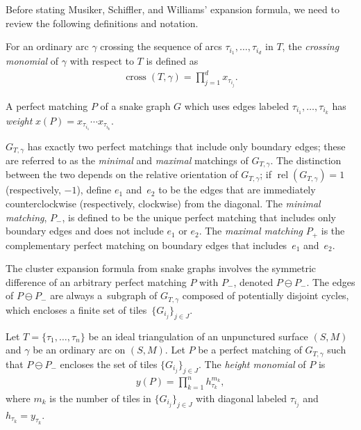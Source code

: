 \documentclass[11pt]{article}
\numberwithin{equation}{section}
\begin{document}
Before stating Musiker, Schiffler, and Williams' expansion formula, we need to review the following definitions and notation.

\begin{Definition}
For an ordinary arc $\gamma$ crossing the sequence of arcs $\tau_{i_1},\dots,\tau_{i_d}$ in $T$, the \emph{crossing monomial} of $\gamma$ with respect to $T$ is defined as
\begin{gather*}
\operatorname{cross}(T,\gamma) = \prod_{j=1}^d x_{\tau_{i_j}}.
\end{gather*}
\end{Definition}

\begin{Definition}
A perfect matching $P$ of a snake graph $G$ which uses edges labeled $\tau_{i_1}, \dots, \tau_{i_k}$ has \emph{weight} $x(P) = x_{\tau_{i_1}}\cdots x_{\tau_{i_k}}$.
\end{Definition}

\begin{Definition}
$G_{T,\gamma}$ has exactly two perfect matchings that include only boundary edges; these are referred to as the \emph{minimal} and \emph{maximal} matchings of $G_{T,\gamma}$. The distinction between the two depends on the relative orientation of $G_{T,\gamma}$; if $\operatorname{rel}(G_{T,\gamma}) = 1$ (respectively, $-1$), define $e_1$ and~$e_2$ to be the edges that are immediately counterclockwise (respectively, clockwise) from the diagonal. The \emph{minimal matching}, $P_{-}$, is defined to be the unique perfect matching that includes only boundary edges and does not include $e_1$ or $e_2$. The \emph{maximal mat\-ching} $P_{+}$ is the complementary perfect matching on boundary edges that includes~$e_1$ and~$e_2$.
\end{Definition}

The cluster expansion formula from snake graphs involves the symmetric difference of an arbitrary perfect matching $P$ with $P_{-}$, denoted $P \ominus P_{-}$. The edges of $P \ominus P_{-}$ are always a~subgraph of $G_{T,\gamma}$ composed of potentially disjoint cycles, which encloses a finite set of tiles~$\{ G_{i_j} \}_{j \in J}$.

\begin{Definition}
Let $T = \{ \tau_1, \dots, \tau_n \}$ be an ideal triangulation of an unpunctured surface $(S,M)$ and $\gamma$ be an ordinary arc on $(S,M)$. Let $P$ be a perfect matching of $G_{T,\gamma}$ such that $P \ominus P_{-}$ encloses the set of tiles $\{ G_{i_j} \}_{j \in J}$. The \emph{height monomial} of $P$ is
\begin{align*}
y(P) = \prod_{k=1}^n h_{\tau_{k}}^{m_k},
\end{align*}
where $m_k$ is the number of tiles in $\{G_{i_j} \}_{j \in J}$ with diagonal labeled $\tau_{i_j}$ and $h_{\tau_k} = y_{\tau_k}$.
\end{Definition}
\end{document}
